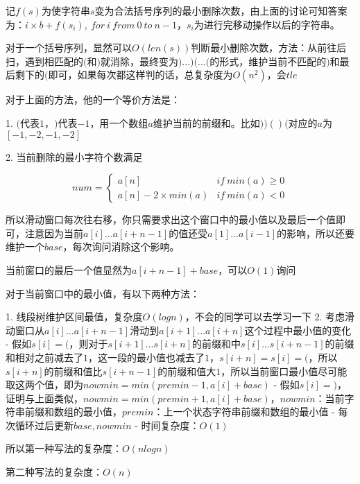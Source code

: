 记$f(s)$为使字符串$s$变为合法括号序列的最小删除次数，由上面的讨论可知答案为：$i\times b + f(s_i), \ for\ i\ from\ 0\ to\ n-1$，$s_i$为进行完移动操作以后的字符串。

对于一个括号序列，显然可以$O(len(s))$判断最小删除次数，方法：从前往后扫，遇到相匹配的$($和$)$就消除，最终变为$)...)(...($的形式，维护当前不匹配的$)$和最后剩下的$($即可，如果每次都这样判的话，总复杂度为$O(n^2)$，会$tle$

对于上面的方法，他的一个等价方法是：

1. $($代表$1$，$)$代表$-1$，用一个数组$a$维护当前的前缀和。比如$))()($对应的$a$为$[-1, -2, -1, -2]$

2. 当前删除的最小字符个数满足

   $$num= \begin{cases} a[n]& {if \ min(a) \geq 0}\\ a[n] - 2 \times min(a)& {if \ min(a) < 0} \end{cases}$$

所以滑动窗口每次往右移，你只需要求出这个窗口中的最小值以及最后一个值即可，注意因为当前$a[i]...a[i + n - 1]$的值还受$a[1]...a[i - 1]$的影响，所以还要维护一个$base$，每次询问消除这个影响。

当前窗口的最后一个值显然为$a[i + n - 1] + base$，可以$O(1)$询问

对于当前窗口中的最小值，有以下两种方法：

1. 线段树维护区间最值，复杂度$O(logn)$，不会的同学可以去学习一下
2. 考虑滑动窗口从$a[i]...a[i + n - 1]$滑动到$a[i + 1]...a[i + n]$这个过程中最小值的变化
   - 假如$s[i] = ($，则对于$s[i + 1]...s[i + n]$的前缀和中$s[i]...s[i + n - 1]$的前缀和相对之前减去了$1$，这一段的最小值也减去了$1$，$s[i + n] = s[i] = ($，所以$s[i + n]$的前缀和值比$s[i + n - 1]$的前缀和值大$1$，所以当前窗口最小值尽可能取这两个值，即为$nowmin = min(premin - 1, a[i] + base)$
   - 假如$s[i] = )$，证明与上面类似，$nowmin = min(premin + 1, a[i] + base)$，$nowmin$：当前字符串前缀和数组的最小值，$premin$：上一个状态字符串前缀和数组的最小值
   - 每次循环过后更新$base,nowmin$
   - 时间复杂度：$O(1)$

所以第一种写法的复杂度：$O(nlogn)$

第二种写法的复杂度：$O(n)$
